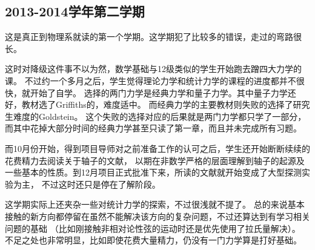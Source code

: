 \documentclass[10pt,a4paper]{article}
\begin{document}
\begin{spacing}{1.6}
\subsection{2013-2014学年第二学期}
这是真正到物理系就读的第一个学期。这学期犯了比较多的错误，走过的弯路很长。\par
这时对降级这件事不以为然，数学基础与12级类似的学生开始跑去蹭四大力学的课。
不过约一个多月之后，学生觉得理论力学和统计力学的课程的进度都并不很快，就开始了自学。
选择的两门力学是经典力学和量子力学。其中量子力学还好，教材选了Griffiths的\cite{grif-qm}，难度适中。
而经典力学的主要教材则失败的选择了研究生难度的Goldstein\cite{gold-cm}。
这个失败的选择对应的后果就是两门力学都只学了一部分，而其中花掉大部分时间的经典力学甚至只读了第一章，而且并未完成所有习题。
\par
而10月份开始，得到项目导师对之前准备工作的认可之后，学生还开始断断续续的花费精力去阅读关于轴子的文献，
以期在非数学严格的层面理解到轴子的起源及一些基本的性质。到12月项目正式批准下来，所读的文献就开始变成了大型探测实验为主，
不过这时还只是停在了解阶段。\par
这学期实际上还夹杂一些对统计力学的探索，不过很浅就不提了。
总的来说基本接触的新方向都停留在虽然不能解决该方向的复杂问题，不过还算达到有学习相关问题的基础
（比如刚接触非相对论性弦的运动时还是优先使用了拉氏量解决）。
不足之处也非常明显，比如即使花费大量精力，仍没有一门力学算是打好基础。


\end{spacing}
\end{document}
